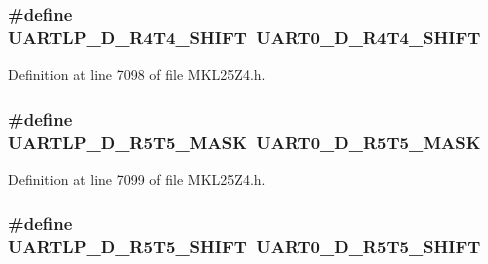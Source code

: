 \subsubsection[{\texorpdfstring{U\+A\+R\+T\+L\+P\+\_\+\+D\+\_\+\+R4\+T4\+\_\+\+S\+H\+I\+FT}{UARTLP_D_R4T4_SHIFT}}]{\setlength{\rightskip}{0pt plus 5cm}\#define U\+A\+R\+T\+L\+P\+\_\+\+D\+\_\+\+R4\+T4\+\_\+\+S\+H\+I\+FT~{\bf U\+A\+R\+T0\+\_\+\+D\+\_\+\+R4\+T4\+\_\+\+S\+H\+I\+FT}}\hypertarget{group___backward___compatibility___symbols_gab6c3b555bd24f99faf903fca53e04b11}{}\label{group___backward___compatibility___symbols_gab6c3b555bd24f99faf903fca53e04b11}


Definition at line 7098 of file M\+K\+L25\+Z4.\+h.

\subsubsection[{\texorpdfstring{U\+A\+R\+T\+L\+P\+\_\+\+D\+\_\+\+R5\+T5\+\_\+\+M\+A\+SK}{UARTLP_D_R5T5_MASK}}]{\setlength{\rightskip}{0pt plus 5cm}\#define U\+A\+R\+T\+L\+P\+\_\+\+D\+\_\+\+R5\+T5\+\_\+\+M\+A\+SK~{\bf U\+A\+R\+T0\+\_\+\+D\+\_\+\+R5\+T5\+\_\+\+M\+A\+SK}}\hypertarget{group___backward___compatibility___symbols_gac7792e726a24f4d48b8c401c854dbfbe}{}\label{group___backward___compatibility___symbols_gac7792e726a24f4d48b8c401c854dbfbe}


Definition at line 7099 of file M\+K\+L25\+Z4.\+h.

\subsubsection[{\texorpdfstring{U\+A\+R\+T\+L\+P\+\_\+\+D\+\_\+\+R5\+T5\+\_\+\+S\+H\+I\+FT}{UARTLP_D_R5T5_SHIFT}}]{\setlength{\rightskip}{0pt plus 5cm}\#define U\+A\+R\+T\+L\+P\+\_\+\+D\+\_\+\+R5\+T5\+\_\+\+S\+H\+I\+FT~{\bf U\+A\+R\+T0\+\_\+\+D\+\_\+\+R5\+T5\+\_\+\+S\+H\+I\+FT}}\hypertarget{group___backward___compatibility___symbols_ga7dc8ab69f890eae57d8f33dd89bcae94}{}\label{group___backward___compatibility___symbols_ga7dc8ab69f890eae57d8f33dd89bcae94}


